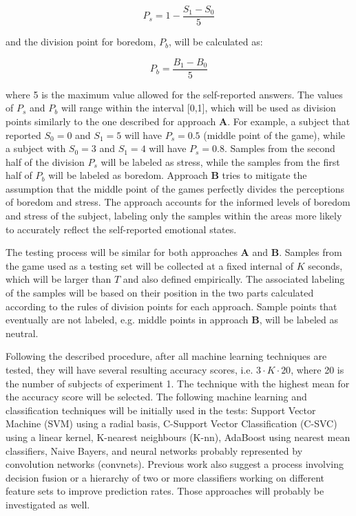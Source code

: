 \begin{equation}
P_s = 1 - \frac{S_1 - S_0}{5}
\end{equation}

and the division point for boredom, $P_b$, will be calculated as:

\begin{equation}
P_b = \frac{B_1 - B_0}{5}
\end{equation}

where 5 is the maximum value allowed for the self-reported answers. The values of $P_s$ and $P_b$ will range within the interval [0,1], which will be used as division points similarly to the one described for approach \textbf{A}. For example, a subject that reported $S_0=0$ and $S_1=5$ will have $P_s=0.5$ (middle point of the game), while a subject with $S_0=3$ and $S_1=4$ will have $P_s=0.8$. Samples from the second half of the division $P_s$ will be labeled as stress, while the samples from the first half of $P_b$ will be labeled as boredom. Approach \textbf{B} tries to mitigate the assumption that the middle point of the games perfectly divides the perceptions of boredom and stress. The approach accounts for the informed levels of boredom and stress of the subject, labeling only the samples within the areas more likely to accurately reflect the self-reported emotional states.

The testing process will be similar for both approaches \textbf{A} and \textbf{B}. Samples from the game used as a testing set will be collected at a fixed internal of $K$ seconds, which will be larger than $T$ and also defined empirically. The associated labeling of the samples will be based on their position in the two parts calculated according to the rules of division points for each approach. Sample points that eventually are not labeled, e.g. middle points in approach \textbf{B}, will be labeled as neutral.

Following the described procedure, after all machine learning techniques are tested, they will have several resulting accuracy scores, i.e. $3 \cdot K \cdot 20$, where 20 is the number of subjects of experiment 1. The technique with the highest mean for the accuracy score will be selected. The following machine learning and classification techniques will be initially used in the tests: Support Vector Machine (SVM) using a radial basis, C-Support Vector Classification (C-SVC) using a linear kernel, K-nearest neighbours (K-nn), AdaBoost using nearest mean classifiers, Naive Bayers, and neural networks probably represented by convolution networks (convnets). Previous work also suggest a process involving decision fusion or a hierarchy of two or more classifiers working on different feature sets to improve prediction rates. Those approaches will probably be investigated as well.

